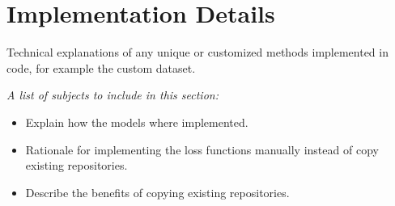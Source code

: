 \section{Implementation Details}
Technical explanations of any unique or customized methods implemented in code, for example the custom dataset.

\textit{A list of subjects to include in this section:}

\begin{itemize}
    \item Explain how the models where implemented.
    \item Rationale for implementing the loss functions manually instead of copy existing repositories.
    \item Describe the benefits of copying existing repositories.
\end{itemize}

